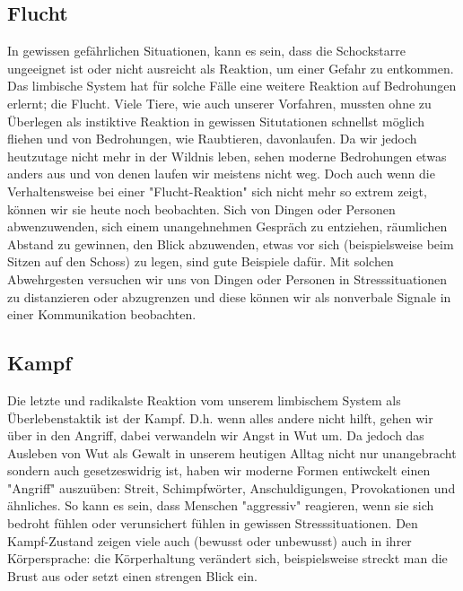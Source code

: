 \subsection{Flucht}
In gewissen gefährlichen Situationen, kann es sein, dass die Schockstarre ungeeignet ist oder nicht ausreicht als Reaktion,
um einer Gefahr zu entkommen. Das limbische System hat für solche Fälle eine weitere Reaktion auf Bedrohungen erlernt;
die Flucht. Viele Tiere, wie auch unserer Vorfahren, mussten ohne zu Überlegen als instiktive Reaktion in gewissen Situtationen
schnellst möglich fliehen und von Bedrohungen, wie Raubtieren, davonlaufen. Da wir jedoch heutzutage
nicht mehr in der Wildnis leben, sehen moderne Bedrohungen etwas anders aus und von denen laufen wir meistens nicht weg.
Doch auch wenn die Verhaltensweise bei einer "Flucht-Reaktion" sich nicht mehr so extrem zeigt, können wir sie heute noch beobachten.
Sich von Dingen oder Personen abwenzuwenden, sich einem unangehnehmen Gespräch zu entziehen, räumlichen Abstand zu gewinnen, den Blick abzuwenden, etwas vor sich
(beispielsweise beim Sitzen auf den Schoss) zu legen, sind gute Beispiele dafür.
Mit solchen Abwehrgesten versuchen wir uns von Dingen oder Personen in Stresssituationen zu distanzieren oder abzugrenzen und diese können wir
als nonverbale Signale in einer Kommunikation beobachten.


\subsection{Kampf}
Die letzte und radikalste Reaktion vom unserem limbischem System als Überlebenstaktik ist der Kampf.
D.h. wenn alles andere nicht hilft, gehen wir über in den Angriff, dabei verwandeln wir Angst in Wut um.
Da jedoch das Ausleben von Wut als Gewalt in unserem heutigen Alltag nicht nur unangebracht sondern auch gesetzeswidrig ist,
haben wir moderne Formen entiwckelt einen "Angriff" auszuüben: Streit, Schimpfwörter, Anschuldigungen, Provokationen und ähnliches.
So kann es sein, dass Menschen "aggressiv" reagieren, wenn sie sich bedroht fühlen oder verunsichert fühlen in gewissen Stresssituationen.
Den Kampf-Zustand zeigen viele auch (bewusst oder unbewusst) auch in ihrer Körpersprache: die Körperhaltung
verändert sich, beispielsweise streckt man die Brust aus oder setzt einen strengen Blick ein. 
